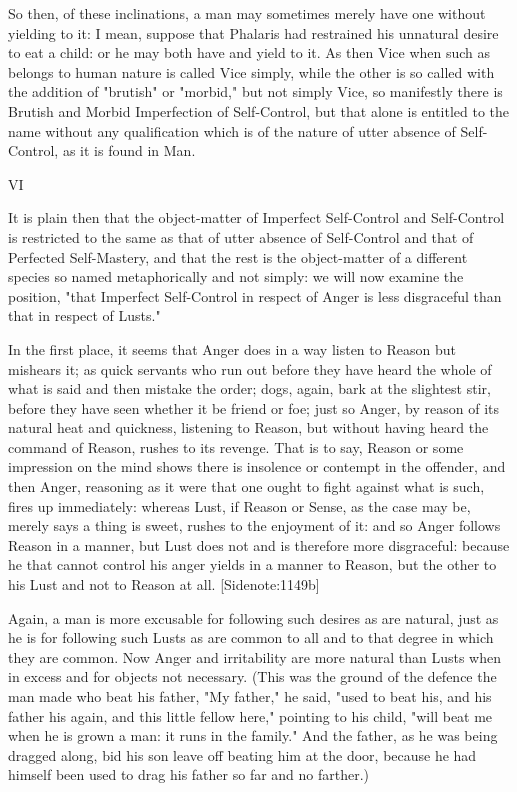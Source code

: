 So then, of these inclinations, a man may sometimes merely have one
without yielding to it: I mean, suppose that Phalaris had restrained his
unnatural desire to eat a child: or he may both have and yield to it. As
then Vice when such as belongs to human nature is called Vice simply,
while the other is so called with the addition of "brutish" or "morbid,"
but not simply Vice, so manifestly there is Brutish and Morbid
Imperfection of Self-Control, but that alone is entitled to the name
without any qualification which is of the nature of utter absence of
Self-Control, as it is found in Man.

VI

It is plain then that the object-matter of Imperfect Self-Control and
Self-Control is restricted to the same as that of utter absence of
Self-Control and that of Perfected Self-Mastery, and that the rest is
the object-matter of a different species so named metaphorically and not
simply: we will now examine the position, "that Imperfect Self-Control
in respect of Anger is less disgraceful than that in respect of Lusts."

In the first place, it seems that Anger does in a way listen to Reason
but mishears it; as quick servants who run out before they have heard
the whole of what is said and then mistake the order; dogs, again, bark
at the slightest stir, before they have seen whether it be friend
or foe; just so Anger, by reason of its natural heat and quickness,
listening to Reason, but without having heard the command of Reason,
rushes to its revenge. That is to say, Reason or some impression on the
mind shows there is insolence or contempt in the offender, and then
Anger, reasoning as it were that one ought to fight against what is
such, fires up immediately: whereas Lust, if Reason or Sense, as the
case may be, merely says a thing is sweet, rushes to the enjoyment of
it: and so Anger follows Reason in a manner, but Lust does not and is
therefore more disgraceful: because he that cannot control his anger
yields in a manner to Reason, but the other to his Lust and not to
Reason at all. [Sidenote:1149b]

Again, a man is more excusable for following such desires as are
natural, just as he is for following such Lusts as are common to all and
to that degree in which they are common. Now Anger and irritability are
more natural than Lusts when in excess and for objects not necessary.
(This was the ground of the defence the man made who beat his father,
"My father," he said, "used to beat his, and his father his again, and
this little fellow here," pointing to his child, "will beat me when he
is grown a man: it runs in the family." And the father, as he was being
dragged along, bid his son leave off beating him at the door, because he
had himself been used to drag his father so far and no farther.)


